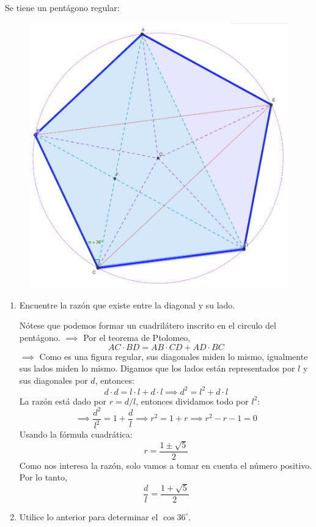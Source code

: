 \begin{problema}
	Se tiene un pentágono regular:
		\begin{figure}[H]
		\centering 
		\includegraphics[scale=0.3]{Images/4}
	\end{figure}
	\begin{enumerate}
	   \item Encuentre la razón que existe entre la diagonal $\mathrm{y}$ su lado.
	   	\begin{dem}
	   	Nótese que podemos formar un cuadrilátero inscrito en el circulo del pentágono. $\implies$ Por el teorema de Ptolomeo, 
	   	$$AC\cdot BD = AB\cdot CD+AD\cdot BC$$
	   	$\implies$ Como es una figura regular, sus diagonales miden lo mismo, igualmente sus lados miden lo mismo. Digamos que los lados están representados por $l$ y sus diagonales por $d$, entonces: 
	   	$$d\cdot d = l\cdot l+d\cdot l\implies d^2 = l^2 +d\cdot l$$
	   	La razón está dado por $r=d/l$, entonces dividamos todo por $l^2$: 
	   	$$\implies \frac{d^2}{l^2}=1+ \frac{d}{l}\implies r^2=1+r\implies r^2-r-1=0$$
	   	Usando la fórmula cuadrática: 
	   	$$r=\frac{1\pm\sqrt{5}}{2}$$
	   	Como nos interesa la razón, solo vamos a tomar en cuenta el número positivo.  Por lo tanto, 
	   	$$\frac{d}{l}=\frac{1+\sqrt{5}}{2}$$
	   \end{dem}
	   \item Utilice lo anterior para determinar el $\cos 36^{\circ}$.

\end{enumerate}
\end{problema}
